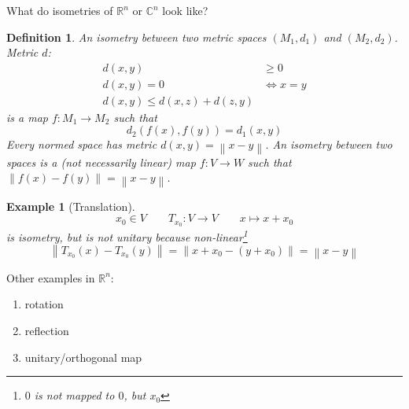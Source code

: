 \documentclass{article}
\newtheorem{example}{Example}  \numberwithin{example}{section}
\newtheorem{definition}{Definition}  \numberwithin{definition}{section}
\newcommand{\norm}[1]{\left\|#1\right\|}
\begin{document}
What do isometries of $\mathbb R^n$ or $\mathbb C^n$ look like?

\begin{definition}
  An isometry between two metric spaces $(M_1, d_1)$ and $(M_2, d_2)$.
  Metric $d$:
  \begin{align*}
    d(x,y) &\geq 0 \\
    d(x,y) = 0 &\iff x = y \\
    d(x,y) \leq d(x,z) + d(z,y)
  \end{align*}
  is a map $f: M_1 \to M_2$ such that
  \[ d_2(f(x), f(y)) = d_1(x, y) \]
  Every normed space has metric $d(x,y) = \norm{x - y}$.
  An isometry between two spaces is a (not necessarily linear) map $f: V \to W$ such that
  $\norm{f(x) - f(y)} = \norm{x - y}$.
\end{definition}

\begin{example}[Translation]
  \[ x_0 \in V \qquad T_{x_0}: V \to V \qquad x \mapsto x + x_0 \]
  is isometry, but is not unitary because non-linear\footnote{$0$ is not mapped to $0$, but $x_0$}
  \[ \norm{T_{x_0}(x) - T_{x_0}(y)} = \norm{x + x_0 - (y + x_0)} = \norm{x - y} \]
\end{example}

Other examples in $\mathbb R^n$:
\begin{enumerate}
  \item rotation
  \item reflection
  \item unitary/orthogonal map
\end{enumerate}
\end{document}
